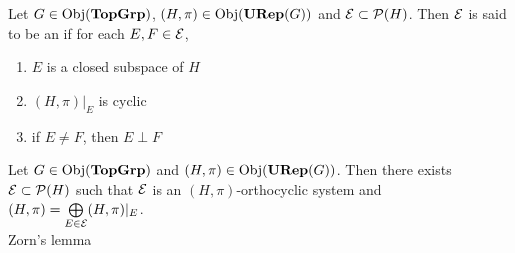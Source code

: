 \documentclass{book}
\begin{document}
	
	\begin{defn}
		Let $G \in \operatorname{Obj}(\operatorname*{\text{\textbf{TopGrp}}})$, $(H, \pi) \in \operatorname{Obj}(\operatorname*{\text{\textbf{URep}}}(G))$ and $\mathcal{E} \subset \mathcal{P}(H)$. Then $\mathcal{E}$ is said to be an  if for each $E, F \in \mathcal{E}$,
		\begin{enumerate}
			\item $E$ is a closed subspace of $H$
			\item $(H, \pi)|_E$ is cyclic
			\item if $E \neq F$, then $E \perp F$
		\end{enumerate}
	\end{defn}

	\begin{ex}
		Let $G \in \operatorname{Obj}(\operatorname*{\text{\textbf{TopGrp}}})$ and $(H, \pi) \in \operatorname{Obj}(\operatorname*{\text{\textbf{URep}}}(G))$. Then there exists $\mathcal{E} \subset \mathcal{P}(H)$ such that $\mathcal{E}$ is an $(H, \pi)$-orthocyclic system and $(H, \pi) =  \bigoplus\limits_{E \in \mathcal{E}} (H, \pi)|_E $. \\
		 Zorn's lemma
	\end{ex}
\end{document}
